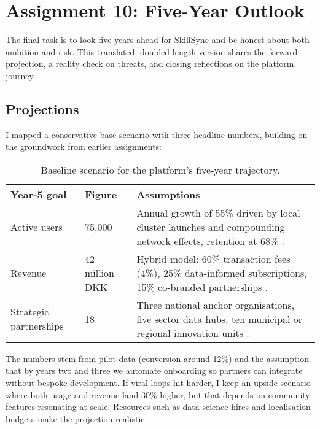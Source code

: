 \section*{Assignment 10: Five-Year Outlook}

The final task is to look five years ahead for SkillSync and be honest about both ambition and risk. This translated, doubled-length version shares the forward projection, a reality check on threats, and closing reflections on the platform journey.

\subsection*{Projections}
I mapped a conservative base scenario with three headline numbers, building on the groundwork from earlier assignments:\newline
\begin{table}[h]
  \centering
  \begin{tabular}{p{3cm}p{3.5cm}p{6cm}}
    \toprule
    \textbf{Year-5 goal} & \textbf{Figure} & \textbf{Assumptions} \\
    \midrule
    Active users & 75,000 & Annual growth of 55\% driven by local cluster launches and compounding network effects, retention at 68\% \citep{Choudary2016,Srnicek2017}. \\
    Revenue & 42 million DKK & Hybrid model: 60\% transaction fees (4\%), 25\% data-informed subscriptions, 15\% co-branded partnerships \citep{ShapiroVarian1999}. \\
    Strategic partnerships & 18 & Three national anchor organisations, five sector data hubs, ten municipal or regional innovation units \citep{Reillier2017}. \\
    \bottomrule
  \end{tabular}
  \caption{Baseline scenario for the platform’s five-year trajectory.}
\end{table}

The numbers stem from pilot data (conversion around 12\%) and the assumption that by years two and three we automate onboarding so partners can integrate without bespoke development. If viral loops hit harder, I keep an upside scenario where both usage and revenue land 30\% higher, but that depends on community features resonating at scale. Resources such as data science hires and localisation budgets make the projection realistic.

